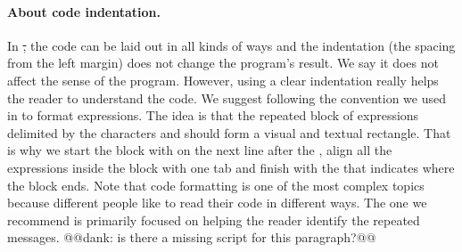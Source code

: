\paragraph{About code indentation.}
In \st, the code can be laid out in all \newcommand{\replace}[2]{kind}{kinds} of ways and the indentation (\newcommand{\replace}[2]{its shape regardings}{the spacing from} the left margin\newcommand{\add}[1]{ to the beginning of the line}) does not change \newcommand{\replace}[2]{a program}{the program's result}. We say it does not affect the sense of the program. However, using a clear indentation really helps the reader to understand the code. \newcommand{\add}[1]{\paragraph
}
We suggest \newcommand{\replace}[2]{to follow}{following} the convention we \newcommand{\replace}[2]{chose}{used in } to format  expressions. The idea is that the repeated block of expressions delimited by the characters \ct{[} and \ct{]} should form a visual and textual rectangle. That is why we start the block with \ct{[} on the next line after the \newcommand{\replace}[2]{ and}{,} align all the expressions inside the block \newcommand{\replace}[2]{to}{with} one tab\newcommand{\add}[1]{,} and finish \newcommand{\replace}[2]{by}{with the} \ct{]} that indicates \newcommand{\replace}[2]{that}{where} the block ends. \newcommand{\add}[1]{\paragraph
}
Note that code formatting is one of the most complex topics because different people like to read their code in different ways. \newcommand{\replace}[2]{So the}{The} one we \newcommand{\replace}[2]{propose}{recommend} is primarily focused \newcommand{\replace}[2]{at}{on} helping the \newcommand{\replace}[2]{identification of}{reader identify} the repeated messages\newcommand{\replace}[2]{ as illustrated in the following code}{.} @@dank: is there a missing script for this paragraph?@@


